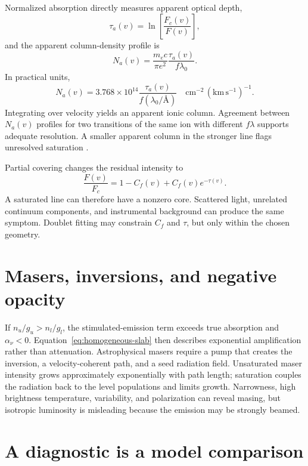 Normalized absorption directly measures apparent optical depth,
\begin{equation}
 \tau_a(v)=\ln\!\left[\frac{F_c(v)}{F(v)}\right],
 \label{eq:apparent-optical-depth}
\end{equation}
and the apparent column-density profile is
\begin{equation}
 N_a(v)=\frac{m_ec}{\pi e^2}
 \frac{\tau_a(v)}{f\lambda_0}.
 \label{eq:aod-column}
\end{equation}
In practical units,
\begin{equation}
 N_a(v)=3.768\times10^{14}
 \frac{\tau_a(v)}{f(\lambda_0/\text{\AA})}
 \quad \mathrm{cm^{-2}\,(km\,s^{-1})^{-1}}.
 \label{eq:aod-practical}
\end{equation}
Integrating over velocity yields an apparent ionic column.  Agreement between
$N_a(v)$ profiles for two transitions of the same ion with different $f\lambda$
supports adequate resolution.  A smaller apparent column in the stronger line flags
unresolved saturation \citep{SavageSembach1991,FoxSavageWakker2005}.

Partial covering changes the residual intensity to
\begin{equation}
 \frac{F(v)}{F_c}=1-C_f(v)+C_f(v)e^{-\tau(v)}.
 \label{eq:partial-covering}
\end{equation}
A saturated line can therefore have a nonzero core.  Scattered light, unrelated
continuum components, and instrumental background can produce the same symptom.
Doublet fitting may constrain $C_f$ and $\tau$, but only within the chosen geometry.

\section{Masers, inversions, and negative opacity}

If $n_u/g_u>n_l/g_l$, the stimulated-emission term exceeds true absorption and
$\alpha_\nu<0$.  Equation~\eqref{eq:homogeneous-slab} then describes exponential
amplification rather than attenuation.  Astrophysical masers require a pump that
creates the inversion, a velocity-coherent path, and a seed radiation field.
Unsaturated maser intensity grows approximately exponentially with path length;
saturation couples the radiation back to the level populations and limits growth.
Narrowness, high brightness temperature, variability, and polarization can reveal
masing, but isotropic luminosity is misleading because the emission may be strongly
beamed.

\section{A diagnostic is a model comparison}

